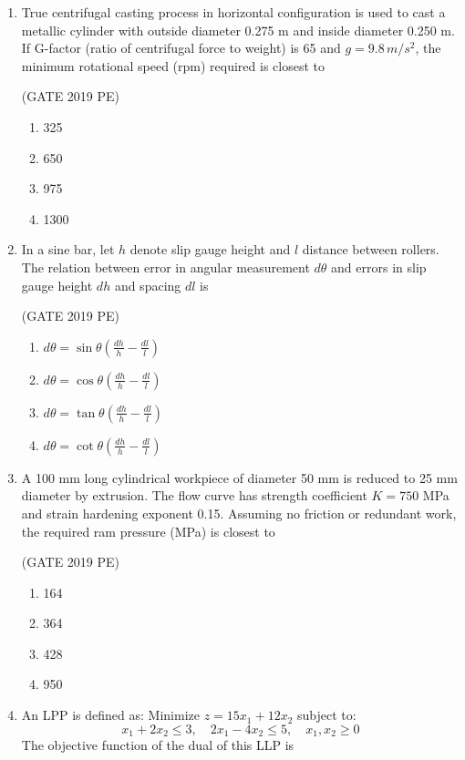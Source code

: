 \documentclass[journal,12pt,onecolumn]{exam}
\theoremstyle{remark}
\begin{document}
\begin{enumerate}
\item True centrifugal casting process in horizontal configuration is used to cast a metallic cylinder with outside diameter 0.275 m and inside diameter 0.250 m. If G-factor (ratio of centrifugal force to weight) is 65 and \(g=9.8\, m/s^2\), the minimum rotational speed (rpm) required is closest to

\hfill{(GATE 2019 PE)}\\
\begin{enumerate}
    \item 325
    \item 650
    \item 975
    \item 1300
\end{enumerate}

\item In a sine bar, let \(h\) denote slip gauge height and \(l\) distance between rollers. The relation between error in angular measurement \(d\theta\) and errors in slip gauge height \(dh\) and spacing \(dl\) is

\hfill{(GATE 2019 PE)}\\
\begin{enumerate}
    \item  \(d\theta = \sin \theta \left(\frac{dh}{h} - \frac{dl}{l}\right)\) 
    \item  \(d\theta = \cos \theta \left(\frac{dh}{h} - \frac{dl}{l}\right)\) 
    \item  \(d\theta = \tan \theta \left(\frac{dh}{h} - \frac{dl}{l}\right)\) 
    \item  \(d\theta = \cot \theta \left(\frac{dh}{h} - \frac{dl}{l}\right)\) 
    
\end{enumerate}

\item A 100 mm long cylindrical workpiece of diameter 50 mm is reduced to 25 mm diameter by extrusion. The flow curve has strength coefficient \(K=750\) MPa and strain hardening exponent 0.15. Assuming no friction or redundant work, the required ram pressure (MPa) is closest to

\hfill{(GATE 2019 PE)}\\
\begin{enumerate}
   
\item 164
\item 364
\item 428
\item 950
\end{enumerate}
\item An LPP is defined as:  
Minimize \(z=15x_1+12x_2\) subject to:  
\[
x_1 + 2x_2 \leq 3, \quad 2x_1 - 4x_2 \leq 5, \quad x_1,x_2 \geq 0
\]  
The objective function of the dual of this LLP is


\end{enumerate}
\end{document}
